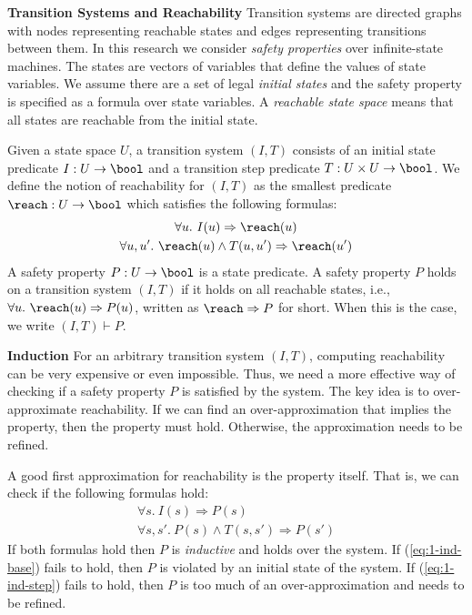 \textbf{Transition Systems and Reachability}
Transition systems are directed graphs with nodes representing reachable states and edges representing transitions between them. In this research we consider \emph{safety properties} over infinite-state machines. The states are vectors of variables that define the values of state variables. We assume there are a set of legal \emph{initial states} and the safety property is specified as a formula over state variables. A \emph{reachable state space} means that all states are reachable from the initial state. 

Given a state space $U$, a transition system $(I,T)$ consists of an
initial state predicate $I : U \to \bool$ and a transition step
predicate $T : U \times U \to \bool$.
We define the notion of
reachability for $(I, T)$ as the smallest predicate $\reach : U \to
\bool$ which satisfies the following formulas:
\begin{gather*}
  \forall u.~ I(u) \Rightarrow \reach(u) \\
  \forall u, u'.~ \reach(u) \land T(u, u') \Rightarrow \reach(u')
\end{gather*}
A safety property $P : U \to \bool$ is a state predicate. A safety
property $P$ holds on a transition system $(I, T)$ if it holds on all
reachable states, i.e., $\forall u.~ \reach(u) \Rightarrow P(u)$,
written as $\reach \Rightarrow P$ for short. When this is the case, we
write $(I, T)\vdash P$.

\textbf{Induction}
For an arbitrary transition system $(I, T)$, computing reachability
can be very expensive or even impossible. Thus, we need a more
effective way of checking if a safety property $P$ is satisfied by the
system. The key idea is to over-approximate reachability. If we can
find an over-approximation that implies the property, then the
property must hold. Otherwise, the approximation needs to be refined.

A good first approximation for reachability is the property itself.
That is, we can check if the following formulas hold:
\begin{gather}
  \forall s.~ I(s) \Rightarrow P(s)
  \label{eq:1-ind-base} \\
  \forall s, s'.~ P(s) \land T(s, s') \Rightarrow P(s')
  \label{eq:1-ind-step}
\end{gather}
If both formulas hold then $P$ is {\em inductive} and holds over the
system. If (\ref{eq:1-ind-base}) fails to hold, then $P$ is violated
by an initial state of the system. If (\ref{eq:1-ind-step}) fails to
hold, then $P$ is too much of an over-approximation and needs to be
refined.

